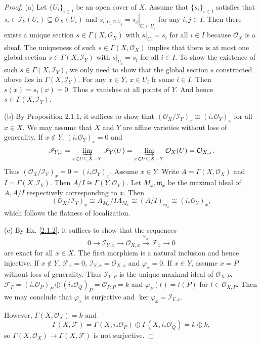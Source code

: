\documentclass[12pt]{amsart}
\begin{document}
\begin{proof}
	(a) Let $\{U_i\}_{i\in I}$ be an open cover of $X$. Assume that $\{s_i\}_{i\in I}$ satisfies that $s_i\in\mathscr{I}_Y(U_i)\subseteq\mathcal{O}_X(U_i)$ and $s_i|_{U_i\cap U_j}=s_j|_{U_i\cap U_j}$ for any $i,j\in I$. Then there exists a unique section $s\in\Gamma(X,\mathcal{O}_X)$ with $s|_{U_i}=s_i$ for all $i\in I$ because $\mathcal{O}_X$ is a sheaf. The uniqueness of such $s\in\Gamma(X,\mathcal{O}_X)$ implies that there is at most one global section $s\in\Gamma(X,\mathscr{I}_Y)$ with $s|_{U_i}=s_i$ for all $i\in I$. To show the existence of such $s\in\Gamma(X,\mathscr{I}_Y)$, we only need to show that the global section $s$ constructed above lies in $\Gamma(X,\mathscr{I}_Y)$. 
	For any $x\in Y$, $x\in U_i$ fr some $i\in I$. Then $s(x)=s_i(x)=0$. Thus $s$ vanishes at all points of $Y$. And hence $s\in\Gamma(X,\mathscr{I}_Y)$.
	
	(b) By Proposition 2.1.1, it suffices to show that $(\mathcal{O}_X/\mathscr{I}_Y)_x\cong(i_*\mathcal{O}_Y)_x$ for all $x\in X$. We may assume that $X$ and $Y$ are affine varieties without loss of generality. If $x\notin Y$, $(i_*\mathcal{O}_Y)_x=0$  and$$\mathscr{I}_{Y,x}=\varinjlim_{x\in U\subseteq X-Y}\mathscr{I}_Y(U)=\varinjlim_{x\in U\subseteq X-Y}\mathcal{O}_X(U)=\mathcal{O}_{X,x}.$$ Thus $(\mathcal{O}_X/\mathscr{I}_Y)_x=0=(i_*\mathcal{O}_Y)_x$. Assume $x\in Y$. Write $A=\Gamma(X,\mathcal{O}_X)$ and $I=\Gamma(X,\mathscr{I}_Y)$. Then $A/I\cong\Gamma(Y,\mathcal{O}_Y)$. Let $M_x,\mathfrak{m}_x$ be the maximal ideal of $A,A/I$ respectively corresponding to $x$. Then $$(\mathcal{O}_X/\mathscr{I}_Y)_x\cong A_{M_x}/IA_{M_x}\cong(A/I)_{\mathfrak{m}_x}\cong(i_*\mathcal{O}_Y)_x,$$ which follows the flatness of localization.
	
	(c) By Ex. \ref{2.1.2}, it suffices to show that the sequences$$0\to\mathscr{I}_{Y,x}\to\mathcal{O}_{X,x}\xrightarrow{\varphi_x}\mathscr{F}_x\to0$$are exact for all $x\in X$. The first morphism is a natural inclusion and hence injective. If $x\notin Y$, $\mathscr{F}_x=0$, $\mathscr{I}_{Y,x}=\mathcal{O}_{X,x}$ and $\varphi_x=0$. If $x\in Y$, assume $x=P$ without loss of generality. Thus $\mathscr{I}_{Y,P}$ is the unique maximal ideal of $\mathcal{O}_{X,P}$, $\mathscr{F}_P=(i_*\mathcal{O}_P)_P\oplus(i_*\mathcal{O}_Q)_P=\mathcal{O}_{P,P}=k$ and $\varphi_P(t)=t(P)$ for $t\in\mathcal{O}_{X,P}$. Then we may conclude that $\varphi_x$ is surjective and $\ker\varphi_x=\mathscr{I}_{Y,x}$.
	
	However, $\Gamma(X,\mathcal{O}_X)=k$ and $$\Gamma(X,\mathscr{F})=\Gamma(X,i_*\mathcal{O}_P)\oplus\Gamma(X,i_*\mathcal{O}_Q)=k\oplus k,$$ so $\Gamma(X,\mathcal{O}_X)\to\Gamma(X,\mathscr{F})$ is not surjective.
	

\end{proof}
\end{document}
